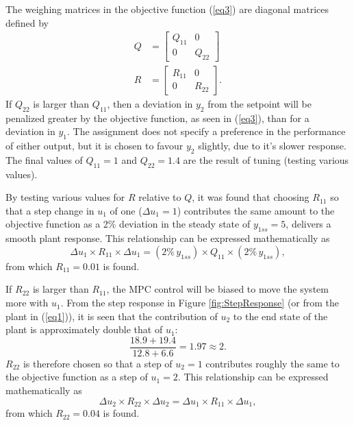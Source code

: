 \documentclass[12pt]{article}
\begin{document}
The weighing matrices in the objective function (\ref{eq3}) are diagonal matrices defined by
\begin{align}
Q &=
\begin{bmatrix}
Q_{11} & 0 \\
0 & Q_{22}
\end{bmatrix} \\[0.5ex]
R &=
\begin{bmatrix}
R_{11} & 0 \\
0 & R_{22}
\end{bmatrix}.
\end{align}
If $Q_{22}$ is larger than $Q_{11}$, then a deviation in $y_2$ from the setpoint will be penalized greater by the objective function, as seen in (\ref{eq3}), than for a deviation in $y_1$. The assignment does not specify a preference in the performance of either output, but it is chosen to favour $y_2$ slightly, due to it's slower response. The final values of $Q_{11}=1$ and $Q_{22}=1.4$ are the result of tuning (testing various values).

By testing various values for $R$ relative to $Q$, it was found that choosing $R_{11}$ so that a step change in $u_1$ of one ($\Delta u_1=1$) contributes the same amount to the objective function as a 2\% deviation in the steady state of $y_{1ss}=5$, delivers a smooth plant response. This relationship can be expressed mathematically as
\begin{equation}
\Delta u_1 \times R_{11} \times \Delta u_1 = (2\% \, y_{1ss}) \times Q_{11} \times (2\% \, y_{1ss}),
\end{equation}
from which $R_{11}=0.01$ is found.

If $R_{22}$ is larger than $R_{11}$, the MPC control will be biased to move the system more with $u_1$. From the step response in Figure \ref{fig:StepResponse} (or from the plant in (\ref{eq1})), it is seen that the contribution of $u_2$ to the end state of the plant is approximately double that of $u_1$:
\begin{equation}
\frac{18.9+19.4}{12.8+6.6} = 1.97 \approx 2.
\end{equation}
$R_{22}$ is therefore chosen so that a step of $u_2=1$ contributes roughly the same to the objective function as a step of $u_1=2$. This relationship can be expressed mathematically as
\begin{equation}
\Delta u_2 \times R_{22} \times \Delta u_2 = \Delta u_1 \times R_{11} \times \Delta u_1,
\end{equation}
from which $R_{22}=0.04$ is found.
\end{document}
